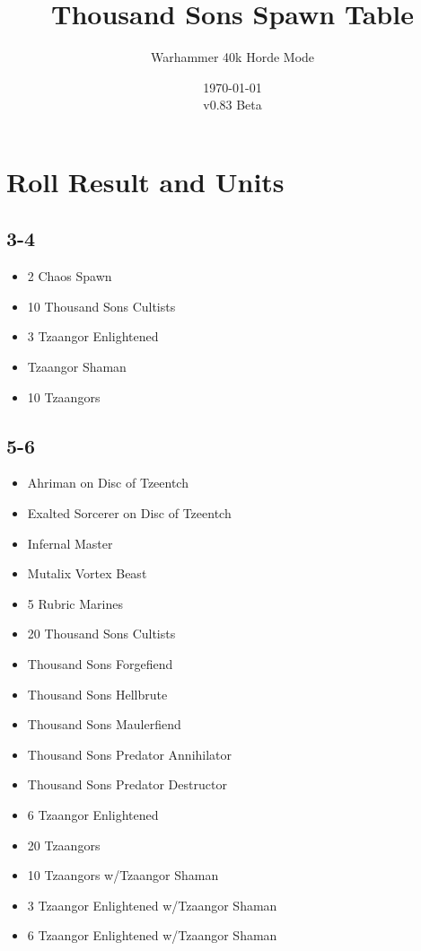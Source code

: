 \documentclass{HordeModeTarot}
\title{Thousand Sons Spawn Table}
\author{Warhammer 40k Horde Mode}
\date{\today \\v0.83 Beta}
\begin{document}
\maketitle

\outputUsingSpawnTableBoilerplate
\section{Roll Result and Units}\hypertarget{roll-results}{}\label{roll-results}

\begin{multicols}{2}

\subsection*{3-4}

\begin{itemize}[leftmargin=*]
\item[] 2 Chaos Spawn
\item[] 10 Thousand Sons Cultists
\item[] 3 Tzaangor Enlightened
\item[] Tzaangor Shaman
\item[] 10 Tzaangors
\end{itemize}

\subsection*{5-6}

\begin{itemize}[leftmargin=*]
\item[] Ahriman on Disc of Tzeentch
\item[] Exalted Sorcerer on Disc of Tzeentch
\item[] Infernal Master
\item[] Mutalix Vortex Beast
\item[] 5 Rubric Marines
\item[] 20 Thousand Sons Cultists
\item[] Thousand Sons Forgefiend
\item[] Thousand Sons Hellbrute
\item[] Thousand Sons Maulerfiend
\item[] Thousand Sons Predator Annihilator
\item[] Thousand Sons Predator Destructor
\item[] 6 Tzaangor Enlightened
\item[] 20 Tzaangors
\item[] 10 Tzaangors w/Tzaangor Shaman
\item[] 3 Tzaangor Enlightened w/Tzaangor Shaman
\item[] 6 Tzaangor Enlightened w/Tzaangor Shaman
\end{itemize}


\end{multicols}
\end{document}
